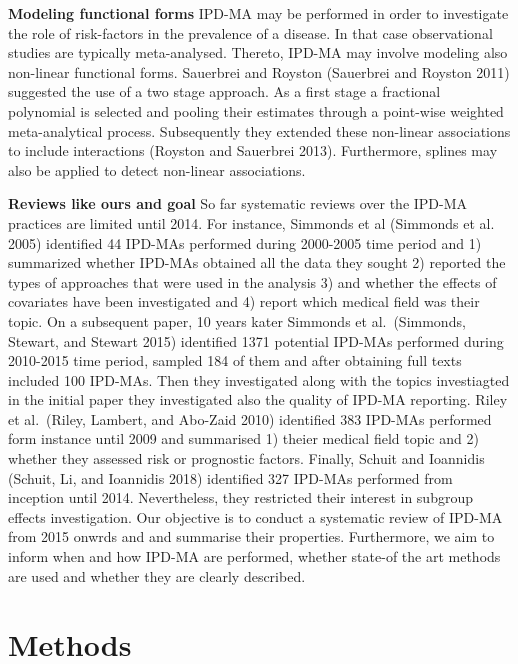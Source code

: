 \documentclass[]{article}
\begin{document}
\textbf{Modeling functional forms} IPD-MA may be performed in order to
investigate the role of risk-factors in the prevalence of a disease. In
that case observational studies are typically meta-analysed. Thereto,
IPD-MA may involve modeling also non-linear functional forms. Sauerbrei
and Royston (Sauerbrei and Royston 2011) suggested the use of a two
stage approach. As a first stage a fractional polynomial is selected and
pooling their estimates through a point-wise weighted meta-analytical
process. Subsequently they extended these non-linear associations to
include interactions (Royston and Sauerbrei 2013). Furthermore, splines
may also be applied to detect non-linear associations.

\textbf{Reviews like ours and goal} So far systematic reviews over the
IPD-MA practices are limited until 2014. For instance, Simmonds et al
(Simmonds et al. 2005) identified 44 IPD-MAs performed during 2000-2005
time period and 1) summarized whether IPD-MAs obtained all the data they
sought 2) reported the types of approaches that were used in the
analysis 3) and whether the effects of covariates have been investigated
and 4) report which medical field was their topic. On a subsequent
paper, 10 years kater Simmonds et al.~(Simmonds, Stewart, and Stewart
2015) identified 1371 potential IPD-MAs performed during 2010-2015 time
period, sampled 184 of them and after obtaining full texts included 100
IPD-MAs. Then they investigated along with the topics investiagted in
the initial paper they investigated also the quality of IPD-MA
reporting. Riley et al.~(Riley, Lambert, and Abo-Zaid 2010) identified
383 IPD-MAs performed form instance until 2009 and summarised 1) theier
medical field topic and 2) whether they assessed risk or prognostic
factors. Finally, Schuit and Ioannidis (Schuit, Li, and Ioannidis 2018)
identified 327 IPD-MAs performed from inception until 2014.
Nevertheless, they restricted their interest in subgroup effects
investigation. Our objective is to conduct a systematic review of IPD-MA
from 2015 onwrds and and summarise their properties. Furthermore, we aim
to inform when and how IPD-MA are performed, whether state-of the art
methods are used and whether they are clearly described.

\newpage

\hypertarget{methods-1}{%
\section{Methods}\label{methods-1}}
\end{document}
